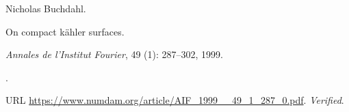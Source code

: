 Nicholas Buchdahl.

\newblock On compact kähler surfaces.

\newblock \emph{Annales de l'Institut Fourier}, 49 (1):
  287--302, 1999.

\newblock {}.

\newblock URL \url{https://www.numdam.org/article/AIF_1999__49_1_287_0.pdf}.
\newblock \emph{Verified}.